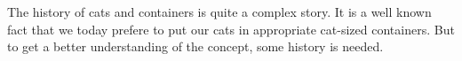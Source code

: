
The history of cats and containers is quite a complex story. It is a well known fact that we today prefere to put our cats in appropriate 
cat-sized containers. But to get a better understanding of the concept, some history is needed.


\newpage

